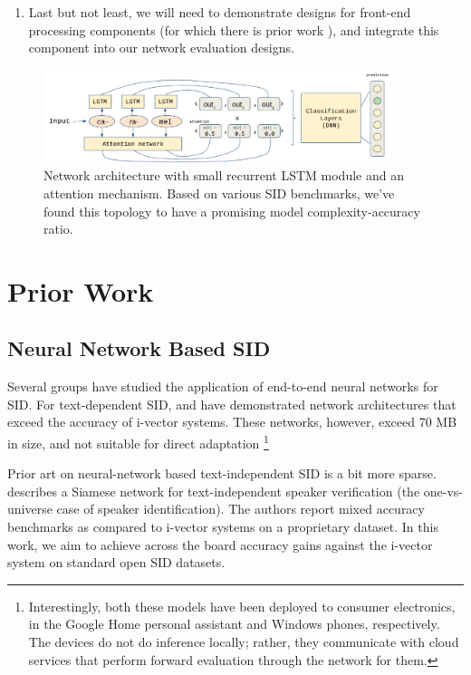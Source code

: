 \documentclass[journal,12pt,onecolumn,draftclsnofoot,]{sty/IEEEtran}
\begin{document}
\begin{enumerate}
\item Last but not least, we will need to demonstrate designs for front-end processing components (for which there is prior work \cite{price_dnn, price_wfst, mfccchip}), and integrate this component into our network evaluation designs.

\end{enumerate}

\begin{figure}
\centering
\includegraphics[width=0.9\textwidth]{figs/attentionnet.png}
\caption{Network architecture with small recurrent LSTM module and an attention mechanism. Based on various SID benchmarks, we’ve found this topology to have a promising model complexity-accuracy ratio.}
\label{attentionnet}
\end{figure}

\section{Prior Work}
\label{priorwork}

\subsection{Neural Network Based SID}
Several groups have studied the application of end-to-end neural networks for SID. For text-dependent SID, \cite{smallfootprint} and \cite{svattn} have demonstrated network architectures that exceed the accuracy of i-vector systems. These networks, however, exceed 70 MB in size, and not suitable for direct adaptation \footnote{Interestingly,  both these models have been deployed to consumer electronics, in the Google Home personal assistant and Windows phones, respectively. The devices do not do inference locally; rather, they communicate with cloud services that perform forward evaluation through the network for them.}

Prior art on neural-network based text-independent SID is a bit more sparse. \cite{tisv} describes a Siamese network for text-independent speaker verification (the one-vs-universe case of speaker identification). The authors report mixed accuracy benchmarks as compared to i-vector systems on a proprietary dataset. In this work, we aim to achieve across the board accuracy gains against the i-vector system on standard open SID datasets.
\end{document}
